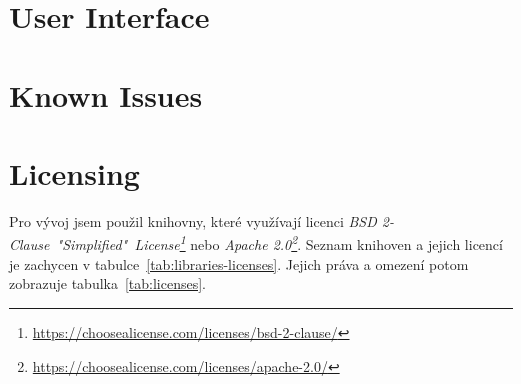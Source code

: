 \section{User Interface}
%


\section{Known Issues}


\section{Licensing}
Pro vývoj jsem použil knihovny, které využívají licenci \textit{BSD 2-Clause\ "Simplified"\ License\footnote{\url{https://choosealicense.com/licenses/bsd-2-clause/}}} nebo \textit{Apache 2.0\footnote{\url{https://choosealicense.com/licenses/apache-2.0/}}}.
Seznam knihoven a jejich licencí je zachycen v tabulce~\ref{tab:libraries-licenses}.
Jejich práva a omezení potom zobrazuje tabulka~\ref{tab:licenses}.

